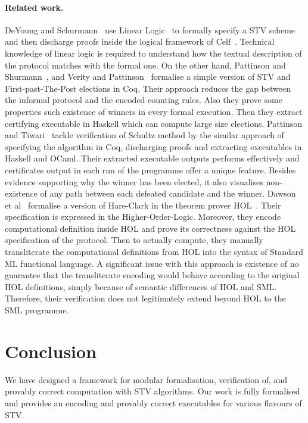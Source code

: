\documentclass{llncs}
\begin{document}
\paragraph{\textbf{Related work.}}
DeYoung and Schurmann~\cite{DBLP:conf/voteid/2011} use Linear
Logic~\cite{DBLP:journals/apal/Girard93} to formally specify a STV
scheme and then discharge proofs inside the logical framework of
Celf~\cite{DBLP:conf/cade/Schack-NielsenS08}. Technical knowledge of
linear logic is required to understand how the textual description
of the protocol matches with the formal one. On the other hand,
Pattinson and Shurmann~\cite{DBLP:conf/ausai/PattinsonS15}, and
Verity and Pattinson~\cite{DBLP:conf/acsw/VerityP17} formalise a
simple version of STV and First-past-The-Post elections in Coq.
Their approach reduces the gap between the informal protocol and the
encoded counting rules. Also they prove some properties such
existence of winners in every formal execution. Then they extract
certifying executable in Haskell which can compute large size
elections. Pattinson and Tiwari~\cite{DBLP:conf/itp/PattinsonT17}
tackle verification of Schultz method by the similar approach of
specifying the algorithm in Coq, discharging proofs and extracting
executables in Haskell and OCaml. Their extracted executable outputs
performs effectively and certificates output in each run of the
programme offer a unique feature. Besides evidence supporting why
the winner has been elected, it also visualises non-existence of any
path between each defeated candidate and the winner. Dawson et
al~\cite{DBLP:conf/voteid/DawsonGM15} formalise a version of
Hare-Clark in the theorem prover HOL~\cite{hol4}. Their
specification is expressed in the Higher-Order-Logic. Moreover, they
encode computational definition inside HOL and prove its correctness
against the HOL specification of the protocol.  Then to actually
compute, they manually transliterate the computational definitions
from HOL into the syntax of Standard ML functional language.  A
significant issue with this approach is existence of no guarantee
that  the transliterate encoding would behave according to the
original HOL definitions, simply because of semantic differences of
HOL and SML. Therefore, their verification does not legitimately
extend beyond HOL to the SML programme. 


   
\section{Conclusion}
We have designed a framework for modular formalisation, verification
of, and provably correct computation with STV algorithms. Our work
is fully formalised and provides an encoding and provably correct
executables for various flavours of STV. 


\end{document}
